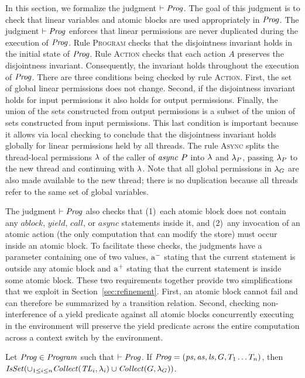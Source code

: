 In this section, we formalize the judgment $\vdash \mathit{Prog}$.
The goal of this judgment is to check that
linear variables and atomic blocks are used appropriately in $\mathit{Prog}$.
The judgment $\vdash \mathit{Prog}$ enforces that linear permissions are never duplicated during the 
execution of $\mathit{Prog}$.
Rule \textsc{Program} checks that the disjointness invariant holds in the initial state of $\mathit{Prog}$.
Rule \textsc{Action} checks that each action $A$ preserves the disjointness invariant.
Consequently, the invariant holds throughout the execution of $\mathit{Prog}$.
There are three conditions being checked by rule \textsc{Action}.
First, the set of global linear permissions does not change.
Second, if the disjointness invariant holds for input permissions it also holds for output permissions.
Finally, the union of the sets constructed from output permissions is a subset of the union of sets
constructed from input permissions.  
This last condition is important because it allows via local checking to conclude that the disjointness invariant holds globally
for linear permissions held by all threads.
The rule \textsc{Async} splits the thread-local permissions $\lambda$ of the caller of $\mathit{async}\ P$ into $\lambda$ 
and $\lambda_P$, passing $\lambda_P$ to the new thread and continuing with $\lambda$.
Note that all global permissions in $\lambda_G$ are also made available to the new thread;
there is no duplication because all threads refer to the same set of global variables.

The judgment $\vdash \mathit{Prog}$ also checks that 
(1)~each atomic block does not contain any $\mathit{ablock}$, $\mathit{yield}$, $\mathit{call}$, or $\mathit{async}$ statements inside it, and
(2)~any invocation of an atomic action (the only computation that can modify the store) must occur inside an atomic block.
To facilitate these checks, the judgments have a parameter containing one of two values,
$\mathrm{a^-}$ stating that the current statement is outside any atomic block and
$\mathrm{a^+}$ stating that the current statement is inside some atomic block.
These two requirements together provide two simplifications that we exploit in Section~\ref{sec:refinement}.
First, an atomic block cannot fail and can therefore be summarized by a transition relation.
Second, checking non-interference of a yield predicate against all atomic blocks concurrently executing 
in the environment will preserve the yield predicate across the entire computation across a context switch by the environment.

\begin{lemma}
Let $\mathit{Prog} \in \mathit{Program}$ such that $\vdash \mathit{Prog}$.
If $\mathit{Prog} = (\mathit{ps}, \mathit{as}, \mathit{ls}, G, T_1 \ldots T_n)$, 
then $\mathit{IsSet}(\cup_{1 \le i \le n} \mathit{Collect}(\mathit{TL}_i, \lambda_i) \cup \mathit{Collect}(G, \lambda_G))$.
\end{lemma}

